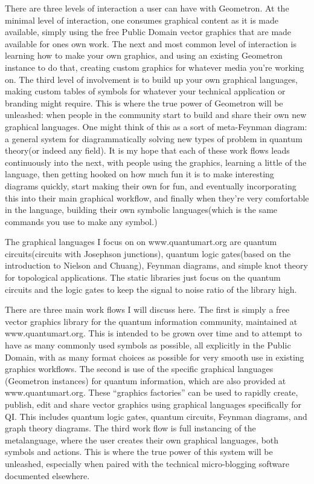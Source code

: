 \documentclass[11pt]{article}
\begin{document}
There are three levels of interaction a user can have with Geometron.  At the minimal level of interaction, one consumes graphical content as it is made available, simply using the free Public Domain vector graphics that are made available for ones own work.  The next and most common level of interaction is learning how to make your own graphics, and using an existing Geometron instance to do that, creating custom graphics for whatever media you're working on.  The third level of involvement is to build up your own graphical languages, making custom tables of symbols for whatever your technical application or branding might require.  This is where the true power of Geometron will be unleashed: when people in the community start to build and share their own new graphical languages.  One might think of this as a sort of meta-Feynman diagram: a general system for diagrammatically solving new types of problem in quantum theory(or indeed any field).  It is my hope that each of these work flows leads continuously into the next, with people using the graphics, learning a little of the language, then getting hooked on how much fun it is to make interesting diagrams quickly, start making their own for fun, and eventually incorporating this into their main graphical workflow, and finally when they're very comfortable in the language, building their own symbolic languages(which is the same commands you use to make any symbol.)

The graphical languages I focus on on www.quantumart.org are quantum circuits(circuits with Josephson junctions), quantum logic gates(based on the introduction to Nielson and Chuang), Feynman diagrams, and simple knot theory for topological applications.  The static libraries just focus on the quantum circuits and the logic gates to keep the signal to noise ratio of the library high.  

    There are three main work flows I will discuss here.  The first is simply a free vector graphics library for the quantum information community, maintained at www.quantumart.org.  This is intended to be grown over time and to attempt to have as many commonly used symbols as possible, all explicitly in the Public Domain, with as many format choices as possible for very smooth use in existing graphics workflows.  The second is use of the specific graphical languages (Geometron instances) for quantum information, which are also provided at www.quantumart.org.  These ``graphics factories'' can be used to rapidly create, publish, edit and share vector graphics using graphical languages specifically for QI.  This includes quantum logic gates, quantum circuits, Feynman diagrams, and graph theory diagrams. The third work flow is full instancing of the metalanguage, where the user creates their own graphical languages, both symbols and actions.  This is where the true power of this system will be unleashed, especially when paired with the technical micro-blogging software documented elsewhere.  
\end{document}
